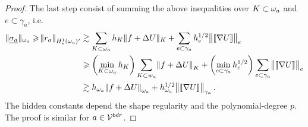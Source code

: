 \documentclass[thesis.tex]{subfiles}
\begin{document}
\begin{proof}
  The last step consist of summing the above inequalities over $K \subset \omega_a$ and $e \subset \gamma_a$, i.e.
  \begin{align*}
    \| \underline{\sigma_a} \|_{\omega_a} \geqslant \norm{r_a}_{H_\star^1(\omega_a)'} &\gtrsim \sum_{K \subset \omega_a} h_K \|f + \Delta U\|_K + \sum_{e \subset \gamma_a} h_e^{1/2} \norm{\llbracket \nabla U \rrbracket}_e\\
    &\geqslant \left(\min_{K \subset \omega_a} h_K\right) \sum_{K \subset w_a} \norm{f + \Delta U}_K +  \left(\min_{e \subset \gamma_a}h_e^{1/2} \right) \sum_{e \subset \gamma_a} \norm{\llbracket \nabla U \rrbracket}_e\\
    &\gtrsim h_{\omega_a} \norm{ f + \Delta U}_{\omega_a} + h_{\omega_a}^{1/2} \norm{ \llbracket \nabla U \rrbracket}_{\gamma_a}.
  \end{align*}
  The hidden constants depend the shape regularity and the polynomial-degree $p$. The proof is similar for $a \in \mathcal{V}^{bdr}$.
\end{proof}
\end{document}
